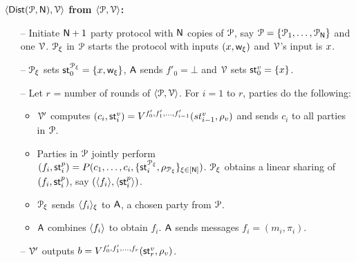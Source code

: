 
\textbf{$\langle \mathsf{Dist}(\mathcal{P}, \mathsf{N}),\mathcal{V}\rangle$ from $\langle \mathcal{P},\mathcal{V}\rangle$:}
\begin{itemize}
	\item[--] Initiate $\mathsf{N} + 1$ party protocol with $\mathsf{N}$ copies of $\mathcal{P}$, say $\mathcal{P} = \{\mathcal{P}_1, \ldots, \mathcal{P}_{\mathsf{N}}\}$ and one $\mathcal{V}$. $\mathcal{P}_\xi$ in $\mathcal{P}$ starts the protocol with inputs $({x}, \mathsf{w}_\xi)$ and $\mathcal{V}$'s input is ${x}$.
	\item[--] $\mathcal{P}_\xi$ sets $\mathsf{st}^{\mathcal{P}_\xi}_0 = \{{x}, \mathsf{w}_{\xi}\}$, $\mathsf{A}$ sends $f'_0 = \bot$ and $\mathcal{V}$ sets $\mathsf{st}^v_0 = \{{x}\}$.
	\item[--] Let $r$ = number of rounds of $\langle \mathcal{P},\mathcal{V}\rangle$. 
	For $i = 1$ to $r$, parties do the following:
	\begin{itemize}
		\item $\mathcal{V}'$ computes $(c_i,\mathsf{st}^v_i) = V^{f'_0, f'_1, \ldots, f'_{i-1}}(st^v_{i-1}, \rho_v)$ and sends $c_i$ to all parties in $\mathcal{P}$.
		\item Parties in $\mathcal{P}$ jointly perform 
		\\$(f_i, \mathsf{st}^p_i) = P(c_1,\ldots, c_i, \{\mathsf{st}^{\mathcal{P}_\xi}_i , \rho_{\mathcal{P}_\xi}\}_{\xi \in [\mathsf{N}]})$. $\mathcal{P}_\xi$ obtains a linear sharing of $(f_i, \mathsf{st}^p_i)$, say $(\langle f_i \rangle, \langle \mathsf{st}^p_i \rangle)$.
		\item $\mathcal{P}_\xi$ sends $\langle f_i \rangle_{\xi}$ to $\mathsf{A}$, a chosen party from $\mathcal{P}$.
		\item $\mathsf{A}$ combines $\langle f_i \rangle$ to obtain $f_i$. $\mathsf{A}$ sends messages $f_i=(m_i, \pi_i)$.
	\end{itemize}	
	\item[--] $\mathcal{V}'$ outputs $b = V^{f'_0, f'_1, \ldots, f_r} ( \mathsf{st}^v_r , \rho_v)$.
\end{itemize}

